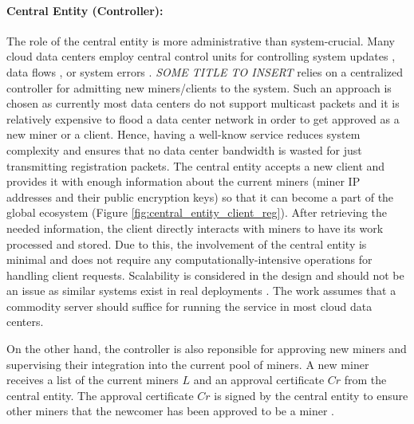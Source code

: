 \documentclass{article}
\newcommand{\projTitle}{SOME TITLE TO INSERT\xspace}
\begin{document}
\paragraph{Central Entity (Controller):} The role of the central entity is more administrative than system-crucial. Many cloud data centers employ central control units for controlling system updates \cite{microsoft-autopilot}, data flows \cite{google_jupiter}, or system errors \cite{microsoft_netpoirot}. \textit{\projTitle} relies on a centralized controller for admitting new miners/clients to the system. Such an approach is chosen as currently most data centers do not support multicast packets and it is relatively expensive to flood a data center network in order to get approved as a new miner or a client. Hence, having a well-know service reduces system complexity and ensures that no data center bandwidth is wasted for just transmitting registration packets. The central entity accepts a new client and provides it with enough information about the current miners (miner IP addresses and their public encryption keys) so that it can become a part of the global ecosystem (Figure \ref{fig:central_entity_client_reg}). After retrieving the needed information, the client directly interacts with miners to have its work processed and stored. Due to this, the involvement of the central entity is minimal and does not require any computationally-intensive operations for handling client requests. Scalability is considered in the design and should not be an issue as similar systems exist in real deployments \cite{hadoop_example}. The work assumes that a commodity server should suffice for running the service in most cloud data centers.
\par


\noindent \newline On the other hand, the controller is also reponsible for approving new miners and supervising their integration into the current pool of miners. A new miner receives a list of the current miners $L$ and an approval certificate $Cr$ from the central entity.
The approval certificate $Cr$ is signed by the central entity to ensure other miners that the newcomer has been approved to be a miner \cite{public-auth-certificate}.
\end{document}
